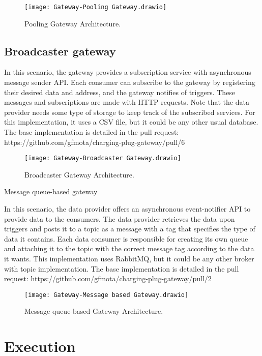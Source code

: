 \begin{figure}
    \centering
    \texttt{[image: Gateway-Pooling Gateway.drawio]}
    \caption{Pooling Gateway Architecture.\label{fig:subfigures3}}
\end{figure}

\subsection*{Broadcaster gateway}
\label{sec:broadcaster}

In this scenario, the gateway provides a subscription service with asynchronous message sender API. Each consumer can subscribe to the gateway by registering their desired data and address, and the gateway notifies of triggers. These messages and subscriptions are made with HTTP requests. Note that the data provider needs some type of storage to keep track of the subscribed services. For this implementation, it uses a CSV file, but it could be any other usual database. The base implementation is detailed in the pull request: https://github.com/gfmota/charging-plug-gateway/pull/6

\begin{figure}
    \centering
    \texttt{[image: Gateway-Broadcaster Gateway.drawio]}
    \caption{Broadcaster Gateway Architecture.\label{fig:subfigures4}}
\end{figure}

{Message queue-based gateway}
\label{sec:messagequeue}

In this scenario, the data provider offers an asynchronous event-notifier API to provide data to the consumers. The data provider retrieves the data upon triggers and posts it to a topic as a message with a tag that specifies the type of data it contains. Each data consumer is responsible for creating its own queue and attaching it to the topic with the correct message tag according to the data it wants. This implementation uses RabbitMQ, but it could be any other broker with topic implementation. The base implementation is detailed in the pull request: https://github.com/gfmota/charging-plug-gateway/pull/2

\begin{figure}
    \centering
    \texttt{[image: Gateway-Message based Gateway.drawio]}
    \caption{Message queue-based Gateway Architecture.\label{fig:subfigures5}}
\end{figure}

\section{Execution}
\label{sec:execution}

